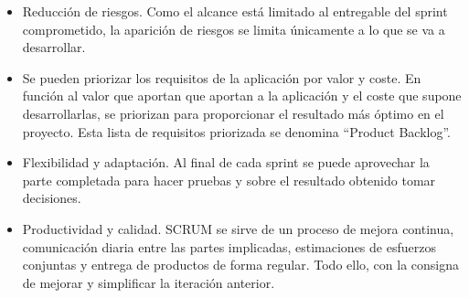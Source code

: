\begin{itemize}

\item Reducción de riesgos. Como el alcance está limitado al entregable del sprint comprometido, la aparición de riesgos se limita únicamente a lo que se va a desarrollar.

\item Se pueden priorizar los requisitos de la aplicación por valor y coste. En función al valor que aportan que aportan a la aplicación y el coste que supone desarrollarlas, se priorizan para proporcionar el resultado más óptimo en el proyecto. Esta lista de requisitos priorizada se denomina ``Product Backlog''.

\item Flexibilidad y adaptación. Al final de cada sprint se puede aprovechar la parte completada para hacer pruebas y sobre el resultado obtenido tomar decisiones.

\item Productividad y calidad. SCRUM se sirve de un proceso de mejora continua, comunicación diaria entre las partes implicadas, estimaciones de esfuerzos conjuntas y entrega de productos de forma regular. Todo ello, con la consigna de mejorar y simplificar la iteración anterior.

\end{itemize}